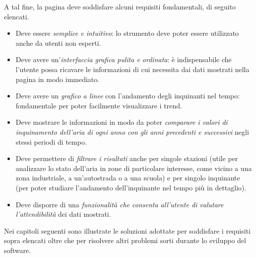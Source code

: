 A tal fine, la pagina deve soddisfare alcuni requisiti fondamentali, di seguito
elencati.
\begin{itemize}
	\item Deve essere \emph{semplice e intuitivo}: lo strumento deve poter
		essere utilizzato anche da utenti non esperti.
	\item Deve avere un'\emph{interfaccia grafica pulita e ordinata}: è
		indispensabile che l'utente possa ricavare le informazioni di
		cui necessita dai dati mostrati nella pagina in modo immediato.
	\item Deve avere un \emph{grafico a linee} con l'andamento degli
		inquinanti nel tempo: fondamentale per poter facilmente
		visualizzare i trend.
	\item Deve mostrare le informazioni in modo da poter \emph{comparare i
		valori di inquinamento dell'aria di ogni anno con gli anni
		precedenti e successivi} negli stessi periodi di tempo.
	\item Deve permettere di \emph{filtrare i risultati} anche per singole
		stazioni (utile per analizzare lo stato dell'aria in zone di
		particolare interesse, come vicino a una zona industriale, a
		un'autostrada o a una scuola) e per singolo inquinante (per
		poter studiare l'andamento dell'inquinante nel tempo più in
		dettaglio).
	\item Deve disporre di una \emph{funzionalità che consenta all'utente di
		valutare l'attendibilità} dei dati mostrati.
\end{itemize}

Nei capitoli seguenti sono illustrate le soluzioni adottate per soddisfare i
requisiti sopra elencati oltre che per risolvere altri problemi sorti durante lo
sviluppo del software.






